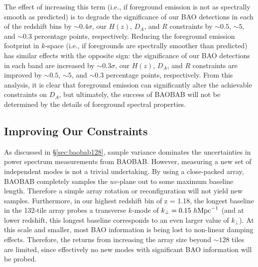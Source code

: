 \documentclass[10pt,iop]{emulateapj}
\begin{document}
The effect of increasing this term (i.e., if foreground emission is not as spectrally smooth as 
predicted) is to degrade the significance of our BAO detections in each of the redshift bins by $\sim 0.4\sigma$, our $H(z)$,
$D_A$, and $R$ constraints by $\sim0.5$, $\sim5$, and $\sim0.3$ percentage points, respectively.
Reducing the foreground emission footprint in $k$-space (i.e., if foregrounds are spectrally
smoother than predicted) has similar effects with the opposite sign: the significance of
our BAO detections in each band are increased by $\sim 0.3\sigma$, our $H(z)$, $D_A$, and $R$ constraints are improved
by $\sim0.5$, $\sim5$, and $\sim0.3$ percentage points, respectively.  From this analysis, it is clear
that foreground emission can significantly alter the achievable constraints on $D_A$, but 
ultimately, the success of BAOBAB will not be determined by the details of foreground spectral
properties.

\subsection{Improving Our Constraints}
\label{sec:improving}

As discussed in \S\ref{sec:baobab128}, sample variance dominates the
uncertainties in power spectrum measurements from BAOBAB.  However, measuring
a new set of independent modes is not a trivial undertaking.  By using a close-packed array,
BAOBAB completely samples the $uv$-plane out to some maximum baseline length.  Therefore a simple
array rotation or reconfiguration will not yield new samples.  Furthermore, in our highest redshift bin of z = 1.18, the longest baseline in the 132-tile array probes a transverse $k$-mode of 
$k_{\perp} = 0.15~h{\rm Mpc}^{-1}$ (and at lower redshift, this longest baseline corresponds
to an even larger value of $k_{\perp}$).  At this scale and smaller, most BAO information is being 
lost to non-linear damping effects.  Therefore, the returns from increasing the array size beyond 
$\sim128$ tiles are limited, since effectively no new modes with significant BAO information will be
probed.
\end{document}
